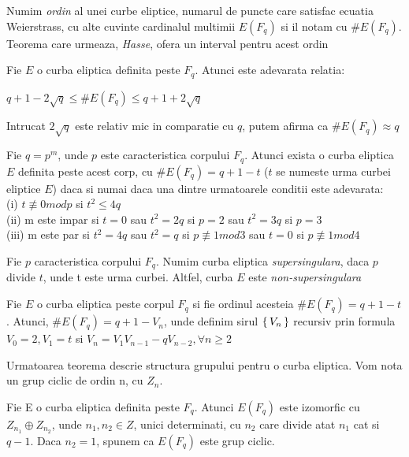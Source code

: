 \begin{dfn}
Numim \textit{ordin} al unei curbe eliptice, numarul de puncte care satisfac ecuatia Weierstrass, cu alte cuvinte cardinalul multimii $E(F_q)$ si il notam cu $\# E(F_q)$. Teorema care urmeaza, \textit{Hasse}, ofera un interval pentru acest ordin
\end{dfn}
\begin{teo}
Fie $E$ o curba eliptica definita peste $F_q$. Atunci este adevarata relatia:
\begin{center} $q + 1 - 2\sqrt{q}\leq \# E(F_q)\leq q+1 + 2\sqrt{q}$ \end{center}
Intrucat $2\sqrt{q}$ este relativ mic in comparatie cu $q$, putem afirma ca $\# E(F_q) \approx q$
\end{teo}
\begin{teo}
Fie $q = p^m$, unde $p$ este caracteristica corpului $F_q$. Atunci exista o curba eliptica $E$ definita peste acest corp, cu $\# E(F_q) = q+1-t$ ($t$ se numeste urma curbei eliptice $E$) daca si numai daca una dintre urmatoarele conditii este adevarata: \\
(i) $t \not\equiv 0 mod p$ si $t^2\leq 4q$ \\
(ii) m este impar si $t=0$ sau $t^2 = 2q$ si $p=2$ sau $t^2 = 3q$ si $p=3$ \\ 
(iii) m este par si $t^2 = 4q$ sau $t^2 = q$ si $p\not\equiv 1 mod 3$ sau $t= 0$ si $p\not\equiv 1 mod 4$
\end{teo}
\begin{dfn}
Fie $p$ caracteristica corpului $F_q$. Numim curba eliptica \textit{supersingulara}, daca $p$ divide $t$, unde t este urma curbei. Altfel, curba $E$ este \textit{non-supersingulara}
\end{dfn}
\begin{teo}
Fie $E$ o curba eliptica peste corpul $F_q$ si fie ordinul acesteia $\# E(F_q)= q+ 1-t$. Atunci, $\# E(F_q) = q+ 1 - V_n$, unde definim sirul $\set {V_n}$ recursiv prin formula $V_0 = 2, V_1=t$ si $V_n = V_1V_{n-1} - qV_{n-2}, \forall n\geq 2$
\end{teo}
Urmatoarea teorema descrie structura grupului pentru o curba eliptica. Vom nota un grup ciclic de ordin n, cu $Z_n$.
\begin{teo}
Fie E o curba eliptica definita peste $F_q$. Atunci $E(F_q)$ este izomorfic cu $Z_{n_1} \oplus Z_{n_2}$, unde $n_1, n_2\in Z$, unici determinati, cu $n_2$ care divide atat $n_1$ cat si $q-1$. Daca $n_2=1$, spunem ca $E(F_q)$ este grup ciclic.
\end{teo}

